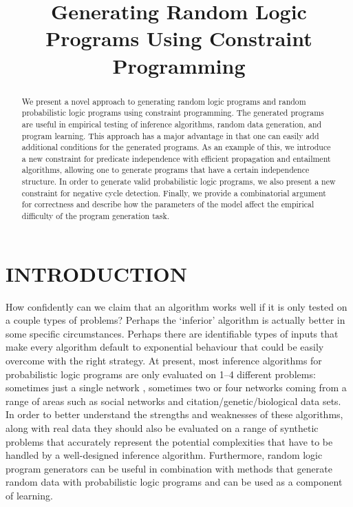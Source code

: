\documentclass[letterpaper]{article}
\title{Generating Random Logic Programs Using Constraint Programming}
\author{} %
\theoremstyle{definition}
\begin{document}

\maketitle

\begin{abstract}
  We present a novel approach to generating random logic programs and
  random probabilistic logic programs using constraint programming. The
  generated programs are useful in empirical testing of inference algorithms,
  random data generation, and program learning. This approach has a major
  advantage in that one can easily add additional conditions for the generated
  programs. As an example of this, we introduce a new constraint for predicate
  independence with efficient propagation and entailment algorithms, allowing
  one to generate programs that have a certain independence structure. In order
  to generate valid probabilistic logic programs, we also present a new
  constraint for negative cycle detection. Finally, we provide a combinatorial
  argument for correctness and describe how the parameters of the model affect
  the empirical difficulty of the program generation task.
\end{abstract}

\section{INTRODUCTION}

How confidently can we claim that an algorithm works well if it is only tested
on a couple types of problems? Perhaps the `inferior' algorithm is actually
better in some specific circumstances. Perhaps there are identifiable
types of inputs that make every algorithm default to exponential behaviour
that could be easily overcome with the right strategy. At present, most
inference algorithms for probabilistic logic programs are only evaluated on 1--4
different problems: sometimes just a single network
\citep{DBLP:journals/tplp/KimmigDRCR11,DBLP:journals/corr/abs-1112-3785,DBLP:conf/iclp/KimmigCRDR08},
sometimes two
\citep{DBLP:journals/corr/abs-1009-3798,DBLP:conf/ecai/BruynoogheMKGVJR10} or
four networks \citep{DBLP:conf/ijcai/VlasselaerBKMR15} coming from a range
of areas such as social networks and citation/genetic/biological data sets. In
order to better understand the strengths and weaknesses of these algorithms,
along with real data they should also be evaluated on a range of synthetic
problems that accurately represent the potential complexities that have to be
handled by a well-designed inference algorithm. Furthermore, random logic
program generators can be useful in combination with methods that generate
random data with probabilistic logic programs \citep{DBLP:conf/soict/Dries15}
and can be used as a component of learning.
\end{document}
